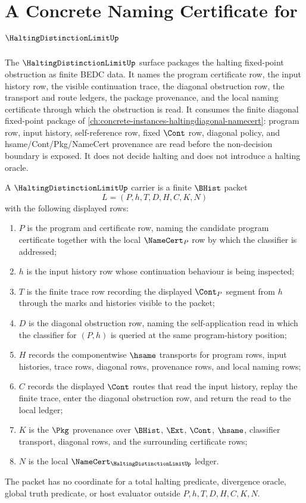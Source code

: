 \chapter{A Concrete Naming Certificate for $\HaltingDistinctionLimitUp$}
\label{ch:concrete-instances-haltingdistinctionlimit-namecert}

The $\HaltingDistinctionLimitUp$ surface packages the halting fixed-point obstruction as finite BEDC data. It names the program certificate row, the input history row, the visible continuation trace, the diagonal obstruction row, the transport and route ledgers, the package provenance, and the local naming certificate through which the obstruction is read. It consumes the finite diagonal fixed-point package of \autoref{ch:concrete-instances-haltingdiagonal-namecert}: program row, input history, self-reference row, fixed $\Cont$ row, diagonal policy, and hsame/Cont/Pkg/NameCert provenance are read before the non-decision boundary is exposed. It does not decide halting and does not introduce a halting oracle.

\begin{definition}
\label{def:halting-distinction-limit-carrier}
A $\HaltingDistinctionLimitUp$ carrier is a finite $\BHist$ packet
$$
L=(P,h,T,D,H,C,K,N)
$$
with the following displayed rows:
\begin{enumerate}
\item $P$ is the program and certificate row, naming the candidate program certificate together with the local $\NameCert_P$ row by which the classifier is addressed;
\item $h$ is the input history row whose continuation behaviour is being inspected;
\item $T$ is the finite trace row recording the displayed $\Cont_P$ segment from $h$ through the marks and histories visible to the packet;
\item $D$ is the diagonal obstruction row, naming the self-application read in which the classifier for $(P,h)$ is queried at the same program-history position;
\item $H$ records the componentwise $\hsame$ transports for program rows, input histories, trace rows, diagonal rows, provenance rows, and local naming rows;
\item $C$ records the displayed $\Cont$ routes that read the input history, replay the finite trace, enter the diagonal obstruction row, and return the read to the local ledger;
\item $K$ is the $\Pkg$ provenance over $\BHist$, $\Ext$, $\Cont$, $\hsame$, classifier transport, diagonal rows, and the surrounding certificate rows;
\item $N$ is the local $\NameCert_{\HaltingDistinctionLimitUp}$ ledger.
\end{enumerate}
The packet has no coordinate for a total halting predicate, divergence oracle, global truth predicate, or host evaluator outside $P,h,T,D,H,C,K,N$.
\end{definition}

